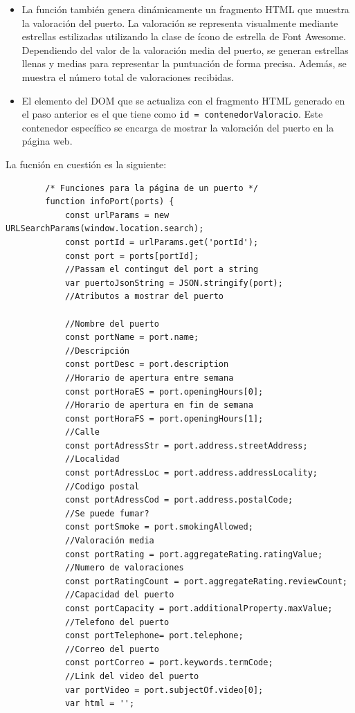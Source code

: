 \documentclass{article}
\begin{document}
\begin{itemize}
\begin{itemize}
\begin{itemize}
        \end{itemize}
        \item La función también genera dinámicamente un fragmento HTML que muestra la valoración del puerto. La valoración se representa visualmente mediante estrellas estilizadas utilizando la clase de ícono de estrella de Font Awesome. Dependiendo del valor de la valoración media del puerto, se generan estrellas llenas y medias para representar la puntuación de forma precisa. Además, se muestra el número total de valoraciones recibidas.
        \item El elemento del DOM que se actualiza con el fragmento HTML generado en el paso anterior es el que tiene como \texttt{id = contenedorValoracio}. Este contenedor específico se encarga de mostrar la valoración del puerto en la página web.
    \end{itemize}
    La fucnión en cuestión es la siguiente:
    \begin{verbatim}
        /* Funciones para la página de un puerto */
        function infoPort(ports) {
            const urlParams = new URLSearchParams(window.location.search);
            const portId = urlParams.get('portId');
            const port = ports[portId];
            //Passam el contingut del port a string
            var puertoJsonString = JSON.stringify(port);
            //Atributos a mostrar del puerto

            //Nombre del puerto
            const portName = port.name; 
            //Descripción
            const portDesc = port.description 
            //Horario de apertura entre semana
            const portHoraES = port.openingHours[0]; 
            //Horario de apertura en fin de semana
            const portHoraFS = port.openingHours[1];
            //Calle
            const portAdressStr = port.address.streetAddress;
            //Localidad 
            const portAdressLoc = port.address.addressLocality;
            //Codigo postal 
            const portAdressCod = port.address.postalCode; 
            //Se puede fumar?
            const portSmoke = port.smokingAllowed;
            //Valoración media
            const portRating = port.aggregateRating.ratingValue; 
            //Numero de valoraciones
            const portRatingCount = port.aggregateRating.reviewCount; 
            //Capacidad del puerto
            const portCapacity = port.additionalProperty.maxValue; 
            //Telefono del puerto
            const portTelephone= port.telephone;
            //Correo del puerto
            const portCorreo = port.keywords.termCode;
            //Link del video del puerto
            var portVideo = port.subjectOf.video[0];
            var html = '';
            

\end{verbatim}
\end{itemize}
\end{document}
